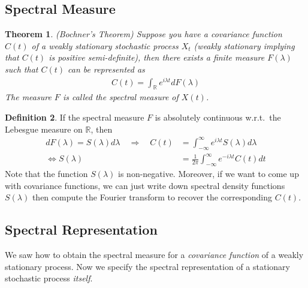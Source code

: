 \documentclass[12pt]{article}
\theoremstyle{plain}
\newtheorem{thm}{Theorem}[section]
\theoremstyle{definition}
\newtheorem{defn}[thm]{Definition}
\theoremstyle{remark}
\begin{document}
\subsection{Spectral Measure}

\begin{thm}\emph{(Bochner's Theorem)}
Suppose you have a covariance function $C(t)$ of a weakly stationary
stochastic process $X_t$ (weakly stationary implying that $C(t)$ is
positive semi-definite), then there exists a finite measure $F(\lambda)$
such that $C(t)$ can be represented as
\begin{align*}
  C(t) = \int_\mathbb{R} e^{i\lambda t} dF(\lambda)
\end{align*}
The measure $F$ is called the \emph{spectral measure} of $X(t)$.
\end{thm}

\begin{defn}
If the spectral measure $F$ is absolutely continuous w.r.t.\ the
Lebesgue measure on $\mathbb{R}$, then
\begin{align*}
  dF(\lambda) = S(\lambda)d\lambda
  \quad \Rightarrow\quad
  C(t)
    &= \int^\infty_{-\infty} e^{i\lambda t} S(\lambda) d\lambda \\
  \Leftrightarrow
  S(\lambda)
    &= \frac{1}{2\pi} \int^\infty_{-\infty} e^{-i\lambda t} C(t) dt
\end{align*}
Note that the function $S(\lambda)$ is non-negative. Moreover, if we
want to come up with covariance functions, we can just write down
spectral density functions $S(\lambda)$ then compute the Fourier
transform to recover the corresponding $C(t)$.
\end{defn}

\subsection{Spectral Representation}

We saw how to obtain the spectral measure for a \emph{covariance
function} of a weakly stationary process. Now we specify the spectral
representation of a stationary stochastic process \emph{itself}.
\end{document}
